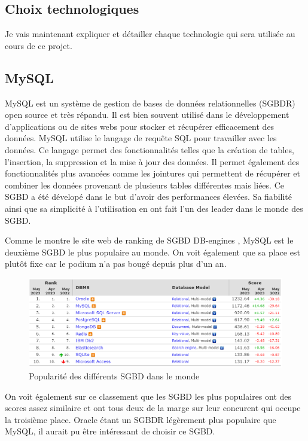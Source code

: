 \subsection{Choix technologiques}
Je vais maintenant expliquer et détailler chaque technologie qui sera utilisée au cours de ce projet.

\subsection{MySQL}
MySQL est un système de gestion de bases de données relationnelles (SGBDR) open source et très répandu. Il est bien souvent utilisé dans le développement d'applications ou de sites webs pour stocker et récupérer efficacement des données. MySQL utilise le langage de requête SQL pour travailler avec les données. Ce langage permet des fonctionnalités telles que la création de tables, l'insertion, la suppression et la mise à jour des données. Il permet également des fonctionnalités plus avancées comme les jointures qui permettent de récupérer et combiner les données provenant de plusieurs tables différentes mais liées. Ce SGBD a été dévelopé dans le but d'avoir des performances élevées. Sa fiabilité ainsi que sa simplicité à l'utilisation en ont fait l'un des leader dans le monde des SGBD.

Comme le montre le site web de ranking de SGBD DB-engines \cite{DBengines}, MySQL est le deuxième SGBD le plus populaire au monde. On voit également que sa place est plutôt fixe car le podium n'a pas bougé depuis plus d'un an.
\begin{center} %
    \begin{figure}[H]
        \includegraphics[width=14cm]{./assets/figures/MySQLPopularity.png}
        \caption{Popularité des différents SGBD dans le monde \label{MySQLPopularity.png}}
    \end{figure}
\end{center}
On voit également sur ce classement que les SGBD les plus populaires ont des scores assez similaire et ont tous deux de la marge sur leur concurent qui occupe la troisième place. Oracle étant un SGBDR légèrement plus populaire que MySQL, il aurait pu être intéressant de choisir ce SGBD.

